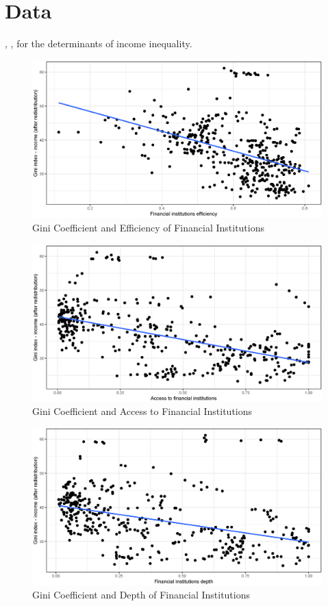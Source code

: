 \documentclass[a4paper,11pt]{article}
\begin{document}
\section{Data}
\cite{roineetal2009}, \citet{nolan2019drivers}, \citet{furceri2019robust} for the determinants of income inequality.

\begin{figure}
    \caption{Gini Coefficient and Efficiency of Financial Institutions}
    \label{fig:ginifie}
\includegraphics[width=\textwidth, keepaspectratio]{figures/FIEGiniNet}
\end{figure}

\begin{figure}
    \caption{Gini Coefficient and Access to Financial Institutions}
    \label{fig:ginifia}
\includegraphics[width=\textwidth, keepaspectratio]{figures/FIAGiniNet}
\end{figure}

\begin{figure}
    \caption{Gini Coefficient and Depth of Financial Institutions}
    \label{fig:ginifid}
\includegraphics[width=\textwidth, keepaspectratio]{figures/FIDGiniNet}
\end{figure}
\end{document}
